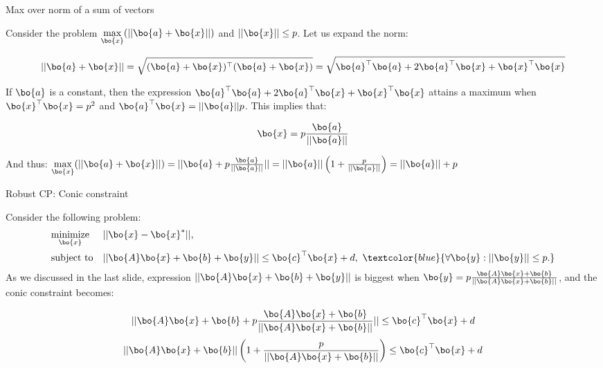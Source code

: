 \documentclass{beamer}
\begin{document}
\begin{frame}{Max over norm of a sum of vectors}
	\begin{flushleft}
		
		Consider the problem $\underset{\bo{x}}{\text{max}}(|| \bo{a} + \bo{x}||)$ and $|| \bo{x} || \leq p$. Let us expand the norm:
		
		\begin{equation}
			|| \bo{a} + \bo{x} || = 
			\sqrt{(\bo{a} + \bo{x})^\top (\bo{a} + \bo{x})} = 
			\sqrt{\bo{a}^\top\bo{a} + 2\bo{a}^\top\bo{x} + \bo{x}^\top\bo{x}}
		\end{equation}
	
	If $\bo{a}$ is a constant, then the expression $\bo{a}^\top\bo{a} + 2\bo{a}^\top\bo{x} + \bo{x}^\top\bo{x}$ attains a maximum when $\bo{x}^\top\bo{x} = p^2$ and $\bo{a}^\top\bo{x} = ||\bo{a}||p$. This implies that:
	
	\begin{equation}
		\bo{x} = p\frac{\bo{a}}{|| \bo{a} ||}
	\end{equation}
	
	And thus: $\underset{\bo{x}}{\text{max}}(|| \bo{a} + \bo{x}||) = 
	|| \bo{a} + p\frac{\bo{a}}{|| \bo{a} ||}|| = 
	|| \bo{a} || \left( 1 + \frac{p}{|| \bo{a} ||} \right) = 
	|| \bo{a} || + p $	
		
	\end{flushleft}
\end{frame}


\begin{frame}{Robust CP: Conic constraint}
	\begin{flushleft}
		
		Consider the following problem:
		\begin{equation}
			\begin{aligned}
				& \underset{\bo{x}}{\text{minimize}} 
				& & ||\bo{x} - \bo{x}^*||, \\
				& \text{subject to}
				& & || \bo{A}\bo{x} + \bo{b} + \bo{y} || \leq \bo{c}^\top \bo{x} + d, \ 
				\textcolor{blue}{
					\forall \bo{y} : ||\bo{y}|| \leq p.} 
			\end{aligned}
		\end{equation}
		As we discussed in the last slide, expression $|| \bo{A}\bo{x} + \bo{b} + \bo{y} ||$ is biggest when $\bo{y} = p \frac{\bo{A}\bo{x} + \bo{b}}{|| \bo{A}\bo{x} + \bo{b} ||}$, and the conic constraint becomes:
		
		\begin{equation}
			|| \bo{A}\bo{x} + \bo{b} + p \frac{\bo{A}\bo{x} + \bo{b}}{|| \bo{A}\bo{x} + \bo{b} ||} || \leq \bo{c}^\top \bo{x} + d
		\end{equation}
		\begin{equation}
		|| \bo{A}\bo{x} + \bo{b}|| \left( 1 + \frac{p}{|| \bo{A}\bo{x} + \bo{b}||} \right) \leq \bo{c}^\top \bo{x} + d
		\end{equation}
		
		
	\end{flushleft}
\end{frame}
\end{document}
